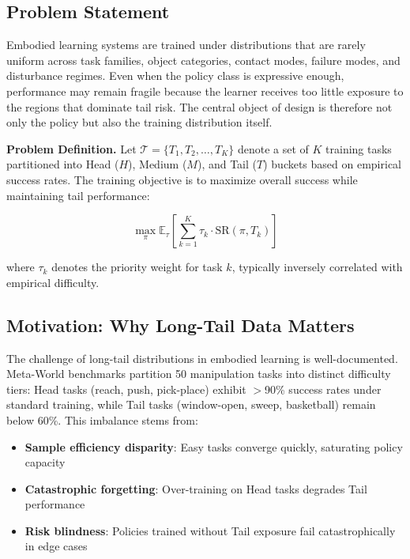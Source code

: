 \documentclass[11pt, a4paper, oneside]{article}
\theoremstyle{plain}
\theoremstyle{break}
\theoremstyle{plain}
\theoremstyle{breakdef}
\theoremstyle{plain}
\theoremstyle{breakrem}
\theoremstyle{plain}
\theoremstyle{breakrem}
\begin{document}
\subsection{Problem Statement}
\label{sec:problem}

Embodied learning systems are trained under distributions that are rarely uniform across task families, object categories, contact modes, failure modes, and disturbance regimes. Even when the policy class is expressive enough, performance may remain fragile because the learner receives too little exposure to the regions that dominate tail risk. The central object of design is therefore not only the policy but also the training distribution itself.

\textbf{Problem Definition.} Let $\mathcal{T} = \{T_1, T_2, \ldots, T_K\}$ denote a set of $K$ training tasks partitioned into Head ($H$), Medium ($M$), and Tail ($T$) buckets based on empirical success rates. The training objective is to maximize overall success while maintaining tail performance:

\begin{equation}
\max_\pi \mathbb{E}_\tau \left[ \sum_{k=1}^K \tau_k \cdot \text{SR}(\pi, T_k) \right]
\label{eq:objective}
\end{equation}

where $\tau_k$ denotes the priority weight for task $k$, typically inversely correlated with empirical difficulty.

\subsection{Motivation: Why Long-Tail Data Matters}
\label{sec:motivation}

The challenge of long-tail distributions in embodied learning is well-documented. Meta-World benchmarks partition 50 manipulation tasks into distinct difficulty tiers: Head tasks (reach, push, pick-place) exhibit $>$90\% success rates under standard training, while Tail tasks (window-open, sweep, basketball) remain below 60\%. This imbalance stems from:

\begin{itemize}
    \item \textbf{Sample efficiency disparity}: Easy tasks converge quickly, saturating policy capacity
    \item \textbf{Catastrophic forgetting}: Over-training on Head tasks degrades Tail performance
    \item \textbf{Risk blindness}: Policies trained without Tail exposure fail catastrophically in edge cases
\end{itemize}
\end{document}
